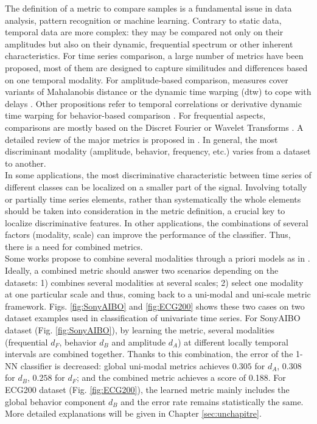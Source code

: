 The definition of a metric to compare samples is a fundamental issue in data analysis, pattern recognition or machine learning. Contrary to static data, temporal data are more complex: they may be compared not only on their amplitudes but also on their dynamic, frequential spectrum or other inherent characteristics. For time series comparison, a large number of metrics have been proposed, most of them are designed to capture similitudes and differences based on one temporal modality. For amplitude-based comparison, measures cover variants of Mahalanobis distance or the dynamic time warping ({\sc dtw}) to cope with delays \cite{Berndt1994c,Rabiner1989,Sakoe1978b,Kruskall1983}. Other propositions refer to temporal correlations or derivative dynamic time warping for behavior-based comparison \cite{Abraham2010b,Rydell2008a,Caiado2006c,Keogh2001a,DUrso2009}. For frequential aspects, comparisons are mostly based on the Discret Fourier or Wavelet Transforms \cite{Sahidullah2012a,Kakizawa1998,Diaz2010,Zhang2006a}. A detailed review of the major metrics is proposed in \cite{Montero2014}. In general, the most discriminant modality (amplitude, behavior, frequency, etc.) varies from a dataset to another. \\
In some applications, the most discriminative characteristic between time series of different classes can be localized on a smaller part of the signal. Involving totally or partially time series elements, rather than systematically the whole elements should be taken into consideration in the metric definition, a crucial key to localize discriminative features. In other applications, the combinations of several factors (modality, scale) can improve the performance of the classifier. Thus, there is a need for combined metrics. \\
Some works propose to combine several modalities through a priori models as in \cite{Douzal-Chouakria2010,Douzal-Chouakria2012a,Son2008}. Ideally, a combined metric should answer two scenarios depending on the datasets: 1) combines several modalities at several scales; 2) select one modality at one particular scale and thus, coming back to a uni-modal and uni-scale metric framework. Figs. \ref{fig:SonyAIBO} and \ref{fig:ECG200} shows these two cases on two dataset examples used in classification of univariate time series. For SonyAIBO dataset (Fig. \ref{fig:SonyAIBO}), by learning the metric, several modalities (frequential $d_F$, behavior $d_B$ and amplitude $d_A$) at different locally temporal intervals are combined together. Thanks to this combination, the error of the 1-NN classifier is decreased: global uni-modal metrics achieves $0.305$ for $d_A$, $0.308$ for $d_B$, $0.258$ for $d_F$; and the combined metric achieves a score of 0.188. For ECG200 dataset (Fig. \ref{fig:ECG200}), the learned metric mainly includes the global behavior component $d_B$ and the error rate remains statistically the same. More detailed explanations will be given in Chapter \ref{sec:unchapitre}.

